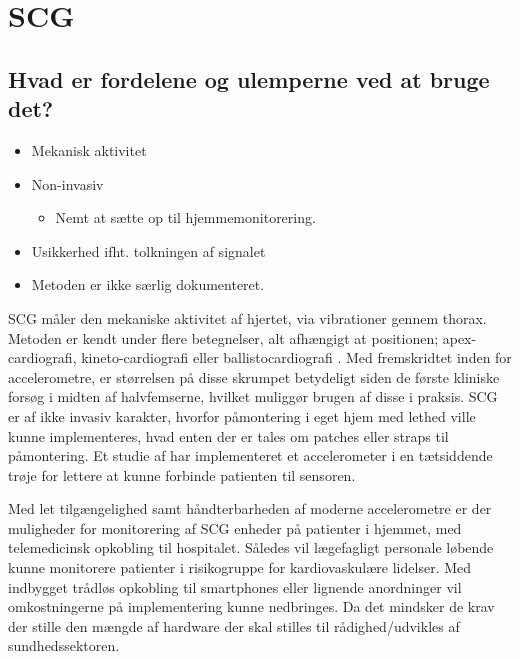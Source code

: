 \section{SCG}\label{scg}
\subsection {Hvad er fordelene og ulemperne ved at bruge det?}

\begin{itemize} 
	\item Mekanisk aktivitet 

	\item Non-invasiv 

		\begin{itemize}
			\item Nemt at sætte op til hjemmemonitorering. 
		\end{itemize}

	\item Usikkerhed ifht. tolkningen af signalet 

	\item Metoden er ikke særlig dokumenteret.
\end{itemize}

SCG måler den mekaniske aktivitet af hjertet, via vibrationer gennem thorax. Metoden er kendt under flere betegnelser, alt afhængigt at positionen; apex-cardiografi, kineto-cardiografi eller ballistocardiografi \cite{Wearable}. Med fremskridtet inden for accelerometre, er størrelsen på disse skrumpet betydeligt siden de første kliniske forsøg i midten af halvfemserne, hvilket muliggør brugen af disse i praksis. SCG er af ikke invasiv karakter, hvorfor påmontering i eget hjem med lethed ville kunne implementeres, hvad enten der er tales om patches eller straps til påmontering. Et studie af \cite{Wearable} har implementeret et accelerometer i en tætsiddende trøje for lettere at kunne forbinde patienten til sensoren.


Med let tilgængelighed samt håndterbarheden af moderne accelerometre  er der muligheder for monitorering af SCG enheder på patienter i hjemmet, med telemedicinsk opkobling til hospitalet. Således vil lægefagligt personale løbende kunne monitorere patienter i risikogruppe for kardiovaskulære lidelser. Med indbygget trådløs opkobling til smartphones eller lignende anordninger vil omkostningerne på implementering kunne nedbringes. Da det mindsker de krav der stille den mængde af hardware der skal stilles til rådighed/udvikles af sundhedssektoren.



